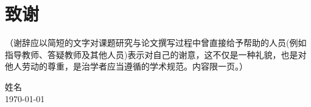 \chapter{致谢}

	
	（谢辞应以简短的文字对课题研究与论文撰写过程中曾直接给予帮助的人员(例如指导教师、答疑教师及其他人员)表示对自己的谢意，这不仅是一种礼貌，也是对他人劳动的尊重，是治学者应当遵循的学术规范。内容限一页。）

\vskip 108pt
\begin{flushright}
	姓名 \\
	\today
\end{flushright}

